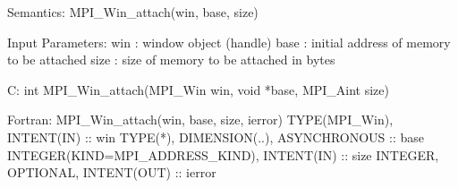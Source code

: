 Semantics:
MPI_Win_attach(win, base, size)

Input Parameters:
win : window object (handle)
base : initial address of memory to be attached
size : size of memory to be attached in bytes

C:
int MPI_Win_attach(MPI_Win win, void *base, MPI_Aint size)

Fortran:
MPI_Win_attach(win, base, size, ierror)
TYPE(MPI_Win), INTENT(IN) :: win
TYPE(*), DIMENSION(..), ASYNCHRONOUS :: base
INTEGER(KIND=MPI_ADDRESS_KIND), INTENT(IN) :: size
INTEGER, OPTIONAL, INTENT(OUT) :: ierror
